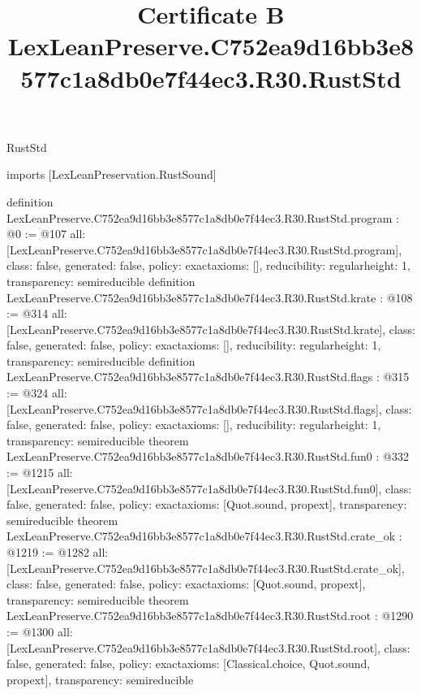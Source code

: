 \begin{lexlean}{RustStd}
\title{Certificate B LexLeanPreserve.C752ea9d16bb3e8577c1a8db0e7f44ec3.R30.RustStd}
\begin{coremodule}
imports [LexLeanPreservation.RustSound]

definition LexLeanPreserve.C752ea9d16bb3e8577c1a8db0e7f44ec3.R30.RustStd.program : @0 := @107 {
  all: [LexLeanPreserve.C752ea9d16bb3e8577c1a8db0e7f44ec3.R30.RustStd.program],
  class: false,
  generated: false,
  policy: exact{axioms: []},
  reducibility: regular{height: 1},
  transparency: semireducible
}
definition LexLeanPreserve.C752ea9d16bb3e8577c1a8db0e7f44ec3.R30.RustStd.krate : @108 := @314 {
  all: [LexLeanPreserve.C752ea9d16bb3e8577c1a8db0e7f44ec3.R30.RustStd.krate],
  class: false,
  generated: false,
  policy: exact{axioms: []},
  reducibility: regular{height: 1},
  transparency: semireducible
}
definition LexLeanPreserve.C752ea9d16bb3e8577c1a8db0e7f44ec3.R30.RustStd.flags : @315 := @324 {
  all: [LexLeanPreserve.C752ea9d16bb3e8577c1a8db0e7f44ec3.R30.RustStd.flags],
  class: false,
  generated: false,
  policy: exact{axioms: []},
  reducibility: regular{height: 1},
  transparency: semireducible
}
theorem LexLeanPreserve.C752ea9d16bb3e8577c1a8db0e7f44ec3.R30.RustStd.fun0 : @332 := @1215 {
  all: [LexLeanPreserve.C752ea9d16bb3e8577c1a8db0e7f44ec3.R30.RustStd.fun0],
  class: false,
  generated: false,
  policy: exact{axioms: [Quot.sound, propext]},
  transparency: semireducible
}
theorem LexLeanPreserve.C752ea9d16bb3e8577c1a8db0e7f44ec3.R30.RustStd.crate_ok : @1219 := @1282 {
  all: [LexLeanPreserve.C752ea9d16bb3e8577c1a8db0e7f44ec3.R30.RustStd.crate_ok],
  class: false,
  generated: false,
  policy: exact{axioms: [Quot.sound, propext]},
  transparency: semireducible
}
theorem LexLeanPreserve.C752ea9d16bb3e8577c1a8db0e7f44ec3.R30.RustStd.root : @1290 := @1300 {
  all: [LexLeanPreserve.C752ea9d16bb3e8577c1a8db0e7f44ec3.R30.RustStd.root],
  class: false,
  generated: false,
  policy: exact{axioms: [Classical.choice, Quot.sound, propext]},
  transparency: semireducible
}


\end{coremodule}
\end{lexlean}
